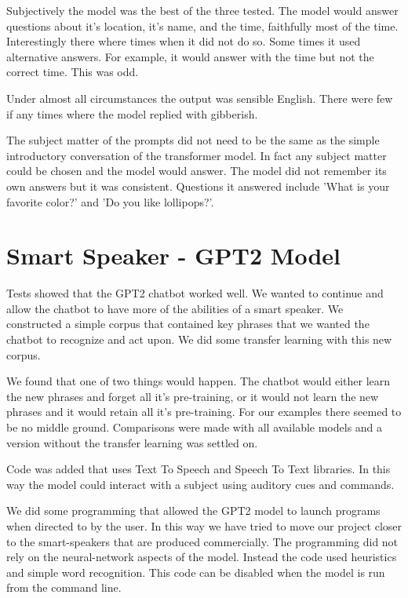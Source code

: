 Subjectively the model was the best of the three tested. The model would answer questions about it's location, it's name, and the time, faithfully most
of the time. Interestingly there where times when it did not do so. Some times it used 
alternative answers. For example, it would answer with the time but not the correct time. This was odd.

Under almost all circumstances the output was sensible English. There were few if any times 
where the model replied with gibberish. 

The subject matter of the prompts did not need to be the
same as the simple introductory conversation of the transformer model. In fact any subject matter
could be chosen and the model would answer. The model did not remember its own answers but it
was consistent. Questions it answered include 'What is your favorite color?' and 'Do you like lollipops?'. 

\section{Smart Speaker - GPT2 Model}
Tests showed that the GPT2 chatbot worked well. We wanted to continue and allow the chatbot to
have more of the abilities of a smart speaker. We constructed a simple corpus that contained
key phrases that we wanted the chatbot to recognize and act upon. We did some transfer learning
with this new corpus.

We found that one of two things would happen. The chatbot would either learn the new phrases and forget all it's pre-training, or it would not learn the new phrases and it would retain all it's 
pre-training. For our examples there seemed to be no middle ground. Comparisons were made with 
all available models and a version without the transfer learning was settled on.

Code was added that uses Text To Speech and Speech To Text libraries. In this way the model could
interact with a subject using auditory cues and commands.

We did some programming that allowed the GPT2 model to launch programs when directed to by
the user. In this way we have tried to move our project closer to the smart-speakers that
are produced commercially. The programming did not rely on the neural-network aspects of the
model. Instead the code used heuristics and simple word recognition. This code can be disabled
when the model is run from the command line.


